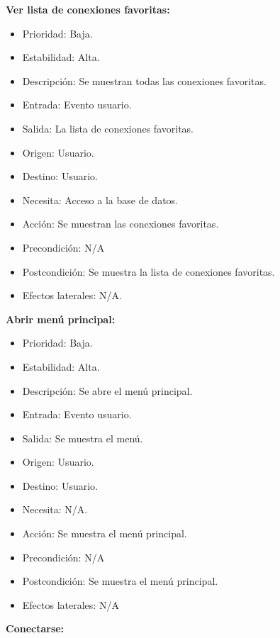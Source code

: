 \textbf{Ver lista de conexiones favoritas:}
\begin{itemize}
\item Prioridad: Baja.
\item Estabilidad: Alta.
\item Descripción: Se muestran todas las conexiones favoritas.
\item Entrada: Evento usuario.
\item Salida: La lista de conexiones favoritas.
\item Origen: Usuario.
\item Destino: Usuario.
\item Necesita: Acceso a la base de datos.
\item Acción: Se muestran las conexiones favoritas.
\item Precondición: N/A
\item Postcondición: Se muestra la lista de conexiones favoritas.
\item Efectos laterales: N/A.\\

\end{itemize}
\newpage
\textbf{Abrir menú principal:}
\begin{itemize}
\item Prioridad: Baja.
\item Estabilidad: Alta.
\item Descripción: Se abre el menú principal.
\item Entrada: Evento usuario.
\item Salida: Se muestra el menú.
\item Origen: Usuario.
\item Destino: Usuario.
\item Necesita: N/A.
\item Acción: Se muestra el menú principal.
\item Precondición: N/A
\item Postcondición: Se muestra el menú principal.
\item Efectos laterales: N/A\\

\end{itemize}

\textbf{Conectarse:}

